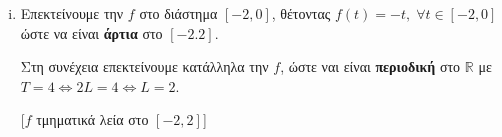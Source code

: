 \documentclass[a4paper,table]{report}
\begin{document}
\begin{solution}
\item {}
  \begin{enumerate}[i)]
    \item 
      Επεκτείνουμε την $f$ στο διάστημα $ [-2,0] $, θέτοντας $ f(t)=-t, \; 
      \forall t \in [-2,0] $ ώστε να είναι \textbf{άρτια} στο $ [-2.2] $.

      Στη συνέχεια επεκτείνουμε κατάλληλα την $f$, ώστε ναι είναι 
      \textbf{περιοδική} στο 
      $ \mathbb{R} $ με $ T=4 \Leftrightarrow 2L=4 \Leftrightarrow \boxed{L=2} $.

      \vspace{\baselineskip}
      \begin{minipage}[t]{0.58\textwidth}
        [$f$ τμηματικά λεία στο $[-2,2]$]
      \end{minipage}


\end{enumerate}
\end{solution}
\end{document}
